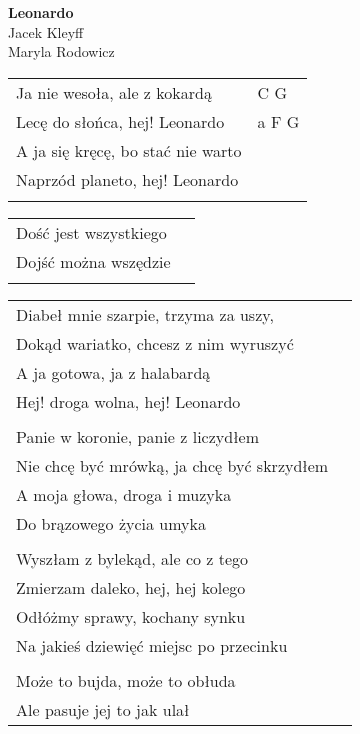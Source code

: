 \documentclass[a5paper]{article}
\begin{document}


\noindent
\fontsize{12pt}{15pt}\selectfont
\textbf{Leonardo} \\
\fontsize{8pt}{10pt}\selectfont
Jacek Kleyff \\ Maryla Rodowicz\\
\fontsize{10pt}{12pt}\selectfont
{}
\begin{tabular}{@{}p{7.50cm}p{3cm}@{}}
\noindent
Ja nie wesoła, ale z kokardą & C G \\
Lecę do słońca, hej! Leonardo & a F G \\
A ja się kręcę, bo stać nie warto \\
Naprzód planeto, hej! Leonardo \\ \\
\end{tabular}

\noindent
\begin{tabular}{@{}p{4.00cm}p{3cm}@{}}
Dość jest wszystkiego \\
Dojść można wszędzie  \\ \\
\end{tabular}

\noindent
\begin{tabular}{@{}p{6.50cm}p{3cm}@{}}
Diabeł mnie szarpie, trzyma za uszy,  \\
Dokąd wariatko, chcesz z nim wyruszyć \\
A ja gotowa, ja z halabardą \\
Hej! droga wolna, hej! Leonardo \\ \\

Panie w koronie, panie z liczydłem\\
Nie chcę być mrówką, ja chcę być skrzydłem\\
A moja głowa, droga i muzyka\\
Do brązowego życia umyka \\ \\

Wyszłam z bylekąd, ale co z tego \\
Zmierzam daleko, hej, hej kolego\\
Odłóżmy sprawy, kochany synku\\
Na jakieś dziewięć miejsc po przecinku\\ \\

Może to bujda, może to obłuda\\
Ale pasuje jej to jak ulał
\end{tabular}
\end{document}
